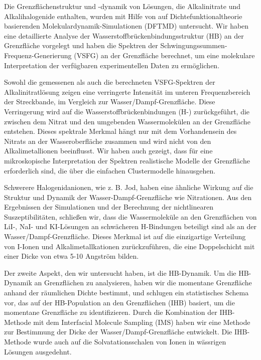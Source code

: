 \documentclass[
11pt, %
ngerman,
english, %
singlespacing, %
headsepline, %
]{MastersDoctoralThesis} %
\begin{document}
{
\begin{extraAbstract}
\addchaptertocentry{\abstractname} %
Die Grenzflächenstruktur und -dynamik von Lösungen, die Alkalinitrate und Alkalihalogenide enthalten, 
wurden mit Hilfe von auf Dichtefunktionaltheorie basierenden
Molekulardynamik-Simulationen (DFTMD) untersucht. Wir haben eine detaillierte Analyse der Wasserstoffbrückenbindungsstruktur (HB) 
an der Grenzfläche vorgelegt und haben die Spektren der Schwingungssummen-Frequenz-Generierung (VSFG) an der Grenzfläche berechnet, 
um eine molekulare Interpretation der verfügbaren experimentellen Daten zu ermöglichen.

%
Sowohl die gemessenen als auch die berechneten VSFG-Spektren der Alkalinitratlösung zeigen eine verringerte Intensität im unteren Frequenzbereich 
der Streckbande, im Vergleich zur Wasser/Dampf-Grenzfläche.
Diese Verringerung wird auf die Wasserstoffbrückenbindungen (H-) zurückgeführt, die zwischen dem Nitrat und den umgebenden Wassermolekülen an der Grenzfläche entstehen.
Dieses spektrale Merkmal hängt nur mit dem Vorhandensein des Nitrats an der Wasseroberfläche zusammen und wird nicht von den Alkalimetallionen beeinflusst.
Wir haben auch gezeigt, dass für eine mikroskopische Interpretation der Spektren
realistische Modelle der Grenzfläche erforderlich sind, die über die einfachen Clustermodelle hinausgehen.

Schwerere Halogenidanionen, wie z. B. Jod, haben eine ähnliche Wirkung auf die Struktur und Dynamik der Wasser-Dampf-Grenzfläche wie Nitrationen.
Aus den Ergebnissen der Simulationen und der Berechnung der nichtlinearen Suszeptibilitäten,
schließen wir, dass die Wassermoleküle an den Grenzflächen von LiI-, NaI- und KI-Lösungen
an schwächeren H-Bindungen beteiligt sind als an der Wasser/Dampf-Grenzfläche.
Dieses Merkmal ist auf die einzigartige Verteilung von I-Ionen und Alkalimetallkationen zurückzuführen,
die eine Doppelschicht mit einer Dicke von etwa 5-10 Angström bilden.

Der zweite Aspekt, den wir untersucht haben, ist die HB-Dynamik.
Um die HB-Dynamik an Grenzflächen zu analysieren,
haben wir die momentane Grenzfläche anhand der räumlichen Dichte bestimmt,
und schlugen ein statistisches Schema vor, das auf der HB-Population an den Grenzflächen (IHB) basiert, um die momentane Grenzfläche zu identifizieren.
Durch die Kombination der IHB-Methode mit dem Interfacial Molecule Sampling (IMS) haben wir eine Methode zur Bestimmung der Dicke der Wasser/Dampf-Grenzfläche entwickelt.
Die IHB-Methode wurde auch auf die Solvatationsschalen von Ionen in wässrigen Lösungen ausgedehnt.
\end{extraAbstract}
}
\end{document}
